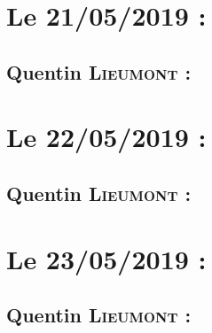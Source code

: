 \section{Le 21/05/2019 :}
    \subsection{Quentin \textsc{Lieumont} :}
        
\newpage
\section{Le 22/05/2019 :}
    \subsection{Quentin \textsc{Lieumont} :}
        
\newpage
\section{Le 23/05/2019 :}
    \subsection{Quentin \textsc{Lieumont} :}
        
